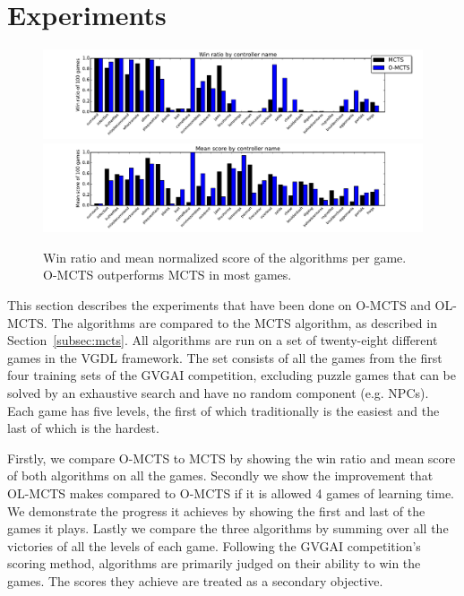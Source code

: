 \section{Experiments}
\label{sec:experiments}
\begin{figure}
\centering
\includegraphics[width=\textwidth]{includes/wins}
\centering
\includegraphics[width=\textwidth]{includes/scores}
\vspace{-.8cm}
\caption{Win ratio and mean normalized score of the algorithms per game. O-MCTS
outperforms MCTS in most games.}
\label{fig:scores}
\end{figure}

This section describes the experiments that have been done on
O-MCTS and OL-MCTS\@. The algorithms are compared to the MCTS
algorithm, as described in Section~\ref{subsec:mcts}. All algorithms are run on a set of
twenty-eight different games in the VGDL framework. The set consists of all the
games from the first four training sets of the GVGAI competition, excluding
puzzle games that can be solved by an exhaustive search and have no random
component (e.g. NPCs). Each game has five levels, the first of which
traditionally is the easiest and the last of which is the hardest.

Firstly, we compare O-MCTS to MCTS by showing the win ratio and mean score of
both algorithms on all the games. Secondly we show the improvement that OL-MCTS
makes compared to O-MCTS if it is allowed 4 games of learning time. We
demonstrate the progress it achieves by showing the first and last of the games
it plays.  Lastly we compare the three algorithms by summing over all the
victories of all the levels of each game.  Following the GVGAI competition's
scoring method, algorithms are primarily judged on their ability to win the
games. The scores they achieve are treated as a secondary objective.


